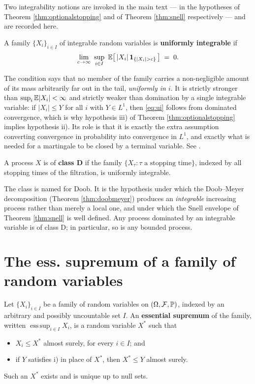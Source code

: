 Two integrability notions are invoked in the main text --- in the hypotheses of Theorem
\ref{thm:optionalstopping} and of Theorem \ref{thm:snell} respectively --- and are recorded here.

\begin{definition}\label{def:ui}
A family $\{X_i\}_{i \in I}$ of integrable random variables is \textbf{uniformly integrable} if
\begin{equation}\label{eq:ui}
\lim_{c \to \infty}\ \sup_{i \in I}\ \mathbb{E}\bigl[\,|X_i|\,\mathbf{1}_{\{|X_i| > c\}}\,\bigr] \;=\; 0 .
\end{equation}
\end{definition}

The condition says that no member of the family carries a non-negligible amount of its mass
arbitrarily far out in the tail, \emph{uniformly in $i$}. It is strictly stronger than
$\sup_i \mathbb{E}|X_i| < \infty$ and strictly weaker than domination by a single integrable variable: if
$|X_i| \leq Y$ for all $i$ with $Y \in L^1$, then \eqref{eq:ui} follows from dominated convergence,
which is why hypothesis iii) of Theorem \ref{thm:optionalstopping} implies hypothesis ii). Its role
is that it is exactly the extra assumption converting convergence in probability into convergence in
$L^1$, and exactly what is needed for a martingale to be closed by a terminal variable. See
\cite[Ch.\ 4]{durrett2019}.

\begin{definition}[Class D]\label{def:classD}
A process $X$ is of \textbf{class D} if the family $\{X_\tau : \tau \text{ a stopping time}\}$,
indexed by all stopping times of the filtration, is uniformly integrable.
\end{definition}

The class is named for Doob. It is the hypothesis under which the Doob--Meyer decomposition
(Theorem \ref{thm:doobmeyer}) produces an \emph{integrable} increasing process rather than merely a
local one, and under which the Snell envelope of Theorem \ref{thm:snell} is well defined. Any
process dominated by an integrable variable is of class D; in particular, so is any bounded
process.

\section{The ess. supremum of a family of random variables}\label{app:esssup}

\begin{definition}\label{def:esssup}
Let $\{X_i\}_{i \in I}$ be a family of random variables on $(\Omega,\mathcal{F},\mathbb{P})$, indexed by an arbitrary and
possibly uncountable set $I$. An \textbf{essential supremum} of the family, written
$\operatorname*{ess\,sup}_{i \in I} X_i$, is a random variable $X^*$ such that
\begin{itemize}
    \item[i)] $X_i \leq X^*$ almost surely, for every $i \in I$; and
    \item[ii)] if $Y$ satisfies i) in place of $X^*$, then $X^* \leq Y$ almost surely.
\end{itemize}
Such an $X^*$ exists and is unique up to null sets.
\end{definition}

